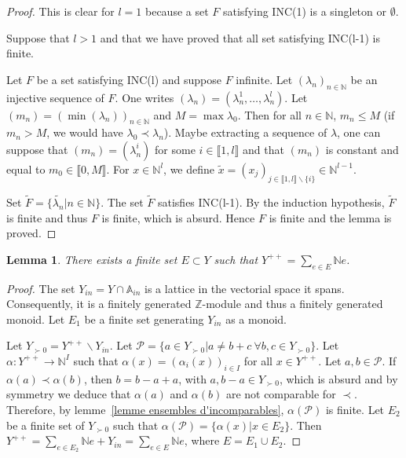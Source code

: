 \documentclass[12pt]{article}
\theoremstyle{plain}
\newtheorem{lemma}[theorem]{Lemma}
\theoremstyle{definition}
\newcommand{\A}{\mathbb{A}}
\newcommand{\N}{\mathbb{N}}
\newcommand{\Z}{\mathbb{Z}}
\begin{document}
\begin{proof} This  is clear for $l=1$ because a set $F$ satisfying INC(1) is a singleton or $\emptyset$. 

Suppose that $l>1$ and that we have proved that all set satisfying INC(l-1) is finite.

Let $F$ be a set  satisfying INC(l) and suppose $F$ infinite. Let $(\lambda_n)_{n\in \N}$ be an injective sequence of $F$. One writes $(\lambda_n)=(\lambda_n^1,\ldots,\lambda_n^l)$. Let $(m_n)=(\min(\lambda_n))_{n\in \N}$ and $M=\max \lambda_{0}$. Then for all $n\in \N$, $m_n\leq M$ (if $m_n>M$, we would have $\lambda_{0}\prec \lambda_n$). Maybe extracting a sequence of $\lambda$, one can suppose that $(m_n)=(\lambda_n^i)$ for some $i\in \llbracket 1, l\rrbracket$ and that $(m_n)$ is constant and equal to $m_0\in \llbracket 0,M\rrbracket$. For $x\in \N^l$, we define $\tilde{x}=(x_j)_{j\in \llbracket 1,l\rrbracket\backslash \{i\}}\in \N^{l-1}$. 
 
 Set $\tilde{F}=\{\tilde{\lambda_n}|n\in\N\}$. The set $\tilde{F}$ satisfies INC(l-1). By the induction hypothesis, $\tilde{F}$ is finite and thus $F$ is finite, which is absurd. Hence $F$ is finite and the lemma is proved.  
 \end{proof}

\begin{lemma}\label{lemme description de Y^{++}}
There exists a finite set $E\subset Y$ such that $Y^{++}=\sum_{e\in E}\N e$.
\end{lemma}

\begin{proof} The set $Y_{in}=Y\cap\A_{in}$ is a lattice in the vectorial space it spans. Consequently, it is a finitely generated $\Z$-module and thus a finitely generated monoid. Let $E_1$ be a finite set generating $Y_{in}$ as a monoid.

 Let $Y_{\succ 0}=Y^{++}\backslash Y_{in}$. Let $\mathcal{P}=\{a\in Y_{\succ 0}|a\neq b+c\ \forall b,c\in Y_{\succ 0}\}$. Let $\alpha:Y^{++}\rightarrow \N^{I}$ such that 
 $\alpha(x)=(\alpha_i(x))_{i\in I}$ for all $x\in Y^{++}$. Let $a,b\in \mathcal{P}$.
  If $\alpha(a)\prec \alpha(b)$, then $b=b-a+a$, with $a,b-a\in Y_{\succ 0}$, which is absurd and by symmetry we deduce that $\alpha(a)$ and $\alpha(b)$ are not comparable for $\prec$. 
Therefore, by lemme~\ref{lemme ensembles d'incomparables}, $\alpha(\mathcal{P})$ is finite. Let $E_2$ be a finite set of $Y_{\succ 0}$ such that $\alpha(\mathcal{P})=\{\alpha(x)|x\in E_2\}$. Then $Y^{++}=\sum_{e\in E_2}\N e+Y_{in}=\sum_{e\in E}\N e$, where $E=E_1\cup E_2$.  
\end{proof}
 
\end{document}
